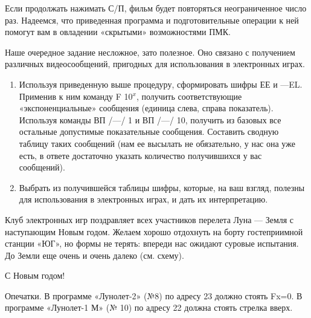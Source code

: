 \documentclass[11pt,a4paper,oneside]{article}
\begin{document}
Если продолжать нажимать С/П, фильм будет повторяться неограниченное число раз. Надеемся, что приведенная программа и подготовительные операции к ней помогут вам в овладении «скрытыми» возможностями ПМК.

Наше очередное задание несложное, зато полезное. Оно связано с получением различных видеосообщений, пригодных для использования в электронных играх.

\begin{enumerate}
\item Используя приведенную выше процедуру, сформировать шифры ЕЕ и —EL. Применив к ним команду F 10$^{x}$, получить соответствующие «экспоненциальные» сообщения (единица слева, справа показатель). Используя команды ВП /—/ 1 и ВП /—/ 10, получить из базовых все остальные допустимые показательные сообщения. Составить сводную таблицу таких сообщений (нам ее высылать не обязательно, у нас она уже есть, в ответе достаточно указать количество получившихся у вас сообщений).
\item Выбрать из получившейся таблицы шифры, которые, на ваш взгляд, полезны для использования в электронных играх, и дать их интерпретацию.
\end{enumerate}

Клуб электронных игр поздравляет всех участников перелета Луна — Земля с наступающим Новым годом. Желаем хорошо отдохнуть на борту гостеприимной станции «ЮГ», но формы не терять: впереди нас ожидают суровые  испытания. До Земли еще очень и очень далеко (см. схему).

С Новым годом!

Опечатки. В программе «Лунолет-2» (№8) по адресу 23 должно стоять Fx=0. В программе «Лунолет-1 М» (№ 10) по адресу 22 должна стоять стрелка вверх.
\end{document}
